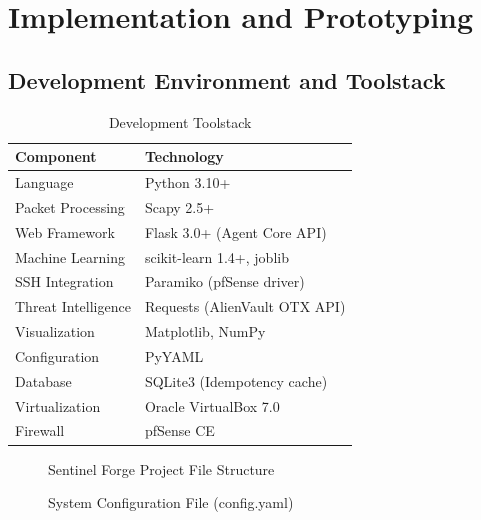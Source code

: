 \chapter{Implementation and Prototyping}

\section{Development Environment and Toolstack}

\begin{table}[h]
\centering
\caption{Development Toolstack}
\label{tab:toolstack}
\begin{tabular}{|l|l|}
\hline
\textbf{Component} & \textbf{Technology} \\
\hline
Language & Python 3.10+ \\
\hline
Packet Processing & Scapy 2.5+ \\
\hline
Web Framework & Flask 3.0+ (Agent Core API) \\
\hline
Machine Learning & scikit-learn 1.4+, joblib \\
\hline
SSH Integration & Paramiko (pfSense driver) \\
\hline
Threat Intelligence & Requests (AlienVault OTX API) \\
\hline
Visualization & Matplotlib, NumPy \\
\hline
Configuration & PyYAML \\
\hline
Database & SQLite3 (Idempotency cache) \\
\hline
Virtualization & Oracle VirtualBox 7.0 \\
\hline
Firewall & pfSense CE \\
\hline
\end{tabular}
\end{table}

\begin{figure}[h]
\centering
{}
\caption{Sentinel Forge Project File Structure}
\label{fig:project_structure}
\end{figure}

\begin{figure}[h]
\centering
{}
\caption{System Configuration File (config.yaml)}
\label{fig:config_yaml}
\end{figure}

